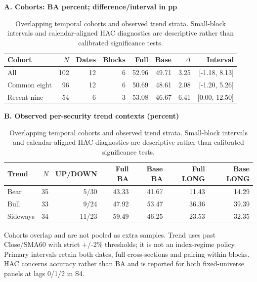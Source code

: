 \begin{table}[!htb]
\centering\small
\setlength{\tabcolsep}{3pt}
\renewcommand{\arraystretch}{1.15}
\caption{Overlapping temporal cohorts and observed trend strata. Small-block intervals and calendar-aligned HAC diagnostics are descriptive rather than calibrated significance tests.}
\label{tab:temporal}
\textbf{A. Cohorts: BA percent; difference/interval in pp}\par\smallskip
\begin{tabular}{lrrrrrrr}
\hline
Cohort & $N$ & Dates & Blocks & Full & Base & $\Delta$ & Interval \\
\hline
All & 102 & 12 & 6 & 52.96 & 49.71 & 3.25 & [-1.18, 8.13] \\
Common eight & 96 & 12 & 6 & 50.69 & 48.61 & 2.08 & [-1.20, 5.26] \\
Recent nine & 54 & 6 & 3 & 53.08 & 46.67 & 6.41 & [0.00, 12.50] \\
\hline
\end{tabular}\par\medskip
\textbf{B. Observed per-security trend contexts (percent)}\par\smallskip
\begin{tabular}{lrrrrrr}
\hline
Trend & $N$ & UP/DOWN & Full BA & Base BA & Full LONG & Base LONG \\
\hline
Bear & 35 & 5/30 & 43.33 & 41.67 & 11.43 & 14.29 \\
Bull & 33 & 9/24 & 47.92 & 53.47 & 36.36 & 39.39 \\
Sideways & 34 & 11/23 & 59.49 & 46.25 & 23.53 & 32.35 \\
\hline
\end{tabular}\par\medskip
\begin{minipage}{\textwidth}\footnotesize Cohorts overlap and are not pooled as extra samples. Trend uses past Close/SMA60 with strict +/-2\% thresholds; it is not an index-regime policy. Primary intervals retain both dates, full cross-sections and pairing within blocks. HAC concerns accuracy rather than BA and is reported for both fixed-universe panels at lags 0/1/2 in S4.\end{minipage}
\end{table}
